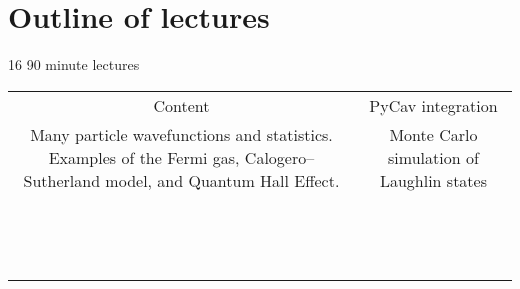 \section{Outline of lectures}

16 90 minute lectures

\begin{table} 
    \begin{tabular}{ c | c }
     Content   & PyCav integration  \\ 
       Many particle wavefunctions and statistics. Examples of the Fermi gas, Calogero--Sutherland model, and Quantum Hall Effect.
   & Monte Carlo simulation of Laughlin states \\ 
         &  \\ 
         &  \\ 
         &  \\ 
         &  \\ 
         &  \\ 
         &  \\ 
         &  \\ 
         &  \\ 
         &  \\ 
         &  \\ 
         &  \\ 
         &  \\ 
         &  \\ 
         &  \\ 
    \end{tabular} 
\end{table}

